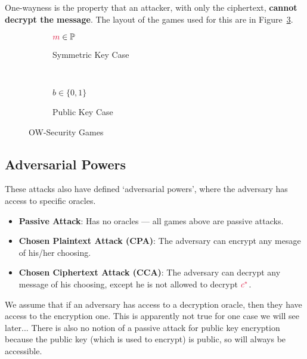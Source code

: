 One-wayness is the property that an attacker, with only the ciphertext, \textbf{cannot decrypt the message}. The layout of the games used for this are in Figure~\ref{fig:ow-sec}.

\begin{figure}[htp!]
    \centering
    \begin{subfigure}[b]{0.4\textwidth}
        \centering
        \begin{cryptogame}{$\cm\in \mathbb{P}$}
        \end{cryptogame}
        \caption{Symmetric Key  Case}
        \label{fig:ow-sec-sym}
    \end{subfigure}
    ~
    \begin{subfigure}[b]{0.4\textwidth}
        \centering
        \begin{cryptogame}{$b\in \{0,1\}$}
            \cgameright{$\cpk$}
        \end{cryptogame}
        \caption{Public Key Case}
        \label{fig:ow-sec-pub}
    \end{subfigure}
    \caption{OW-Security Games}
    \label{fig:ow-sec}
\end{figure}

\subsection{Adversarial Powers}
These attacks also have defined `adversarial powers', where the adversary has access to specific oracles.
\begin{itemize}
    \item \textbf{Passive Attack}: Has no oracles --- all games above are passive attacks.
    \item \textbf{Chosen Plaintext Attack (CPA)}: The adversary can encrypt any mesage of his/her choosing.
    \item \textbf{Chosen Ciphertext Attack (CCA)}: The adversary can decrypt any message of his choosing, except he is not allowed to decrypt $\ccast$.
\end{itemize}
We assume that if an adversary has access to a decryption oracle, then they have access to the encryption one. This is apparently not true for one case we will see later... There is also no notion of a passive attack for public key encryption because the public key (which is used to encrypt) is public, so will always be accessible.


